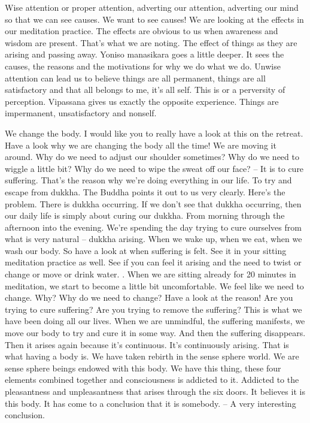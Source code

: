 \documentclass[letterpaper,10pt,english]{sphinxmanual}
\begin{document}
\sphinxAtStartPar
Wise attention or proper attention, adverting our attention, adverting
our mind so that we can see causes. We want to see causes! We are looking
at the effects in our meditation practice. The effects are obvious to us when
awareness and wisdom are present. That’s what we are noting. The effect of
things as they are arising and passing away. Yoniso manasikara goes a little
deeper. It sees the causes, the reasons and the motivations for why we do
what we do. Unwise attention can lead us to believe things are all permanent, things are all satisfactory and that all belongs to me, it’s all self. This is
or a perversity of perception. Vipassana gives us exactly the
opposite experience. Things are impermanent, unsatisfactory and non\sphinxhyphen{}self.

\sphinxAtStartPar
We change the body. I would like you to really have a look at this on
the retreat. Have a look why we are changing the body all the time! We are
moving it around. Why do we need to adjust our shoulder sometimes? Why
do we need to wiggle a little bit? Why do we need to wipe the sweat off our
face? – It is to cure suffering. That’s the reason why we’re doing everything
in our life. To try and escape from dukkha. The Buddha points it out to us
very clearly. Here’s the problem. There is dukkha occurring. If we don’t see
that dukkha occurring, then our daily life is simply about curing our dukkha.
From morning through the afternoon into the evening. We’re spending the
day  trying  to  cure  ourselves  from  what  is  very  natural  –  dukkha  arising.
When we wake up, when we eat, when we wash our body. So have a look
at when suffering is felt. See it in your sitting meditation practice as well.
See  if  you  can  feel  it  arising  and  the  need  to  twist  or  change  or  move  or
drink water.
. When we are
  sitting already for 20 minutes in meditation, we start to become a little bit
uncomfortable. We feel like we need to change. Why? Why do we need to
change?  Have  a  look  at  the  reason! Are  you  trying  to  cure  suffering? Are
you trying to remove the suffering? This is what we have been doing all our
lives. When we are unmindful, the suffering manifests, we move our body
to try and cure it in some way. And then the suffering disappears. Then it
arises again because it’s continuous. It’s continuously arising. That is what
having a body is. We have taken rebirth in the sense sphere world. We are
sense sphere beings endowed with this body. We have this thing, these four
elements  combined  together  and  consciousness  is  addicted  to  it. Addicted
to the pleasantness and unpleasantness that arises through the six doors. It
believes it is this body. It has come to a conclusion that it is somebody. – A
very interesting conclusion.
\end{document}
